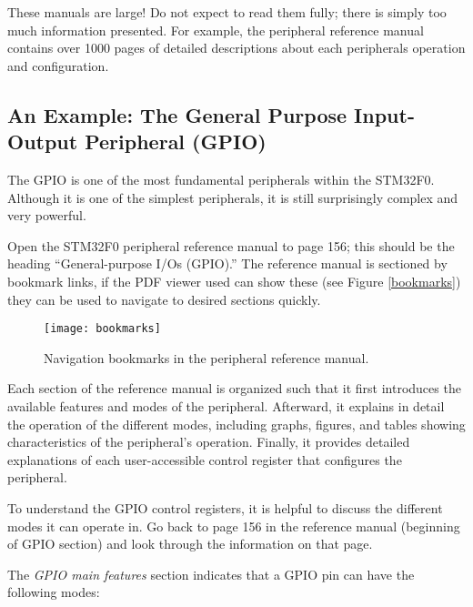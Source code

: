 \documentclass[11pt,fleqn]{book} %
\begin{document}
\begin{warning}
    These manuals are large! Do not expect to read them fully; there is simply too much information presented. For example, the peripheral reference manual contains over 1000 pages of detailed descriptions about each peripherals operation and configuration.
\end{warning}

\subsection{An Example: The General Purpose Input-Output Peripheral (GPIO)}


The GPIO is one of the most fundamental peripherals within the STM32F0. Although it is one of the simplest peripherals, it is still surprisingly complex and very powerful.

Open the STM32F0 peripheral reference manual to page 156; this should be the heading ``General-purpose I/Os (GPIO).'' The reference manual is sectioned by bookmark links, if the PDF viewer used can show these (see Figure \vref{bookmarks}) they can be used to navigate to desired sections quickly.

\begin{figure}[]
    \centering\texttt{[image: bookmarks]}
    \caption{Navigation bookmarks in the peripheral reference manual.}
    \label{bookmarks}
\end{figure}

Each section of the reference manual is organized such that it first introduces the available features and modes of the peripheral. Afterward, it explains in detail the operation of the different modes,  including graphs, figures, and tables showing characteristics of the peripheral's operation. Finally, it provides detailed explanations of each user-accessible control register that configures the peripheral.

To understand the GPIO control registers, it is helpful to discuss the different modes it can operate in. Go back to page 156 in the reference manual (beginning of GPIO section) and look through the information on that page.

The \textit{GPIO main features} section indicates that a GPIO pin can have the following modes:
\end{document}
